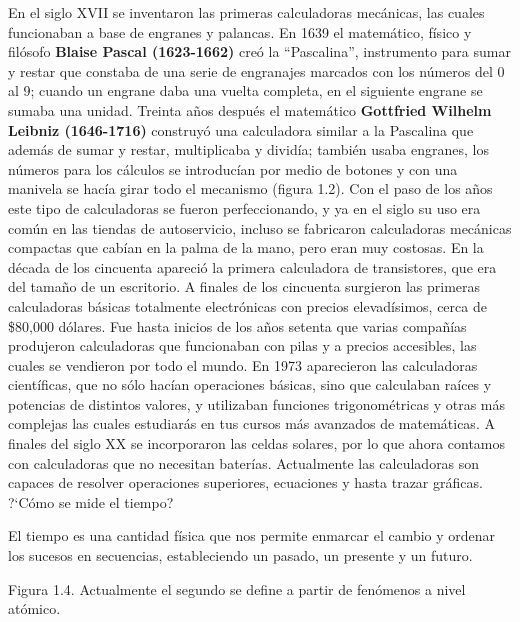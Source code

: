 \documentclass[11pt]{book}
\begin{document}
En el siglo XVII se inventaron las primeras calculadoras mec\'anicas, las cuales
funcionaban a base de engranes y palancas.
En 1639 el matem\'atico, f\'isico y fil\'osofo \textbf{Blaise Pascal (1623-1662)}
cre\'o la ``Pascalina'', instrumento para sumar y
restar que constaba de una serie de engranajes marcados con los n\'umeros del 0
al 9; cuando un engrane daba una vuelta completa,
en el siguiente engrane se sumaba una unidad.
Treinta años despu\'es el matem\'atico \textbf{Gottfried Wilhelm Leibniz
  (1646-1716)} construy\'o una calculadora similar a la
Pascalina que adem\'as de sumar y restar, multiplicaba y divid\'ia; tambi\'en usaba
engranes, los n\'umeros para los c\'alculos se
introduc\'ian por medio de botones y con una manivela se hac\'ia girar todo el
mecanismo (figura 1.2).
Con el paso de los años este tipo de calculadoras se fueron perfeccionando, y
ya en el siglo su uso era com\'un en las tiendas
de autoservicio, incluso se fabricaron calculadoras mec\'anicas compactas que
cab\'ian en la palma de la mano, pero eran muy
costosas. En la d\'ecada de los cincuenta apareci\'o la primera calculadora de
transistores, que era del tamaño de un escritorio.
A finales de los cincuenta surgieron las primeras calculadoras b\'asicas
totalmente electr\'onicas con precios elevad\'isimos,
cerca de \$80,000 d\'olares. Fue hasta inicios de los años setenta que varias
compañ\'ias produjeron calculadoras que funcionaban
con pilas y a precios accesibles, las cuales se vendieron por todo el mundo. En
1973 aparecieron las calculadoras cient\'ificas,
que no s\'olo hac\'ian operaciones b\'asicas, sino que calculaban ra\'ices y potencias
de distintos valores, y utilizaban funciones
trigonom\'etricas y otras m\'as complejas las cuales estudiar\'as en tus cursos m\'as
avanzados de matem\'aticas. A finales del siglo XX
se incorporaron las celdas solares, por lo que ahora contamos con calculadoras
que no necesitan bater\'ias. Actualmente las
calculadoras son capaces de resolver operaciones superiores, ecuaciones y hasta
trazar gr\'aficas.
?`C\'omo se mide el tiempo?

El tiempo es una cantidad f\'isica que nos permite enmarcar el cambio y ordenar
los sucesos en secuencias, estableciendo un pasado,
un presente y un futuro.

Figura 1.4. Actualmente el segundo se define a partir de fen\'omenos a nivel
at\'omico.
\end{document}

